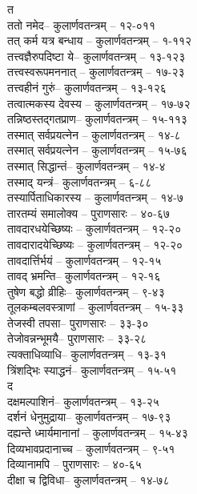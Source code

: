 \begin{raggedright}
\begin{parcolumns}[colwidths={1=.55\textwidth,2=.55\textwidth}]{2}
{{\large त}\\
ततो नमेद– 	कुलार्णवतन्त्रम्  – १२-०११\\
तत् कर्म यत्र बन्धाय	– 	कुलार्णवतन्त्रम्  – १-११२\\
तत्त्वज्ञैरुपदिष्टा ये– 	कुलार्णवतन्त्रम्  – १३-१२३\\
तत्त्वस्वरूपमननात्	– 	कुलार्णवतन्त्रम्  – १७-२३\\
तत्त्वहीनं गुरुं– 	कुलार्णवतन्त्रम्  – १३-१२६\\
तत्वात्मकस्य देवस्य	– 	कुलार्णवतन्त्रम्  – १७-७२\\
तन्निष्ठस्तद्गतप्राण– 	कुलार्णवतन्त्रम्  – १५-११३\\
तस्मात् सर्वप्रयत्नेन	– 	कुलार्णवतन्त्रम्  – १४-८\\
तस्मात् सर्वप्रयत्नेन	– 	कुलार्णवतन्त्रम्  – १५-७६\\
तस्मात् सिद्धान्तं– 	कुलार्णवतन्त्रम्  – १४-४\\
तस्माद् यन्त्रं– 	कुलार्णवतन्त्रम्  – ६-८८\\
तस्यार्पिताधिकारस्य	– 	कुलार्णवतन्त्रम्  – १४-७\\
तारतम्यं समालोक्य	– 	पुराणसारः   – ४०-६७	\\
तावदारधयेच्छिष्यः	– 	कुलार्णवतन्त्रम्  – १२-२०\\
तावदारादयेच्छिष्यः	– 	कुलार्णवतन्त्रम्  – १२-२०\\
तावदार्त्तिर्भयं	– कुलार्णवतन्त्रम्  – १२-१५\\
तावद् भ्रमन्ति– 	कुलार्णवतन्त्रम्  – १२-१६\\
तुषेण बद्धो व्रीहिः– 	 कुलार्णवतन्त्रम्  – ९-४३\\
तूलकम्बलवस्त्राणां	– 	कुलार्णवतन्त्रम्  – १५-३३\\
तेजस्वी तपसा– 	पुराणसारः   – ३३-३०\\
तेजोवन्नन्भूमयै– 	पुराणसारः   – ३३-२८\\
त्यक्ताधिव्याधि– 	कुलार्णवतन्त्रम्  – १३-३१\\
त्रिंशद्भिः स्याद्धनं– 	कुलार्णवतन्त्रम्  – १५-५१\\
{\large द}\\
दक्षमल्पाशिनं– 	कुलार्णवतन्त्रम्  – १३-२५\\
दर्शनं धेनुमुद्राया– 	 कुलार्णवतन्त्रम्  – १७-९३\\
दह्यन्ते ध्मार्यमानानां	– 	कुलार्णवतन्त्रम्  – १५-४३\\
दिव्यभावप्रदानाच्च	– 	कुलार्णवतन्त्रम्  – ९-५१\\
दिव्यानामपि	– 	पुराणसारः   – ४०-६५\\
दीक्षा च द्विविधा– 	कुलार्णवतन्त्रम्  – १४-७८\\
}
\end{parcolumns}
\end{raggedright}
